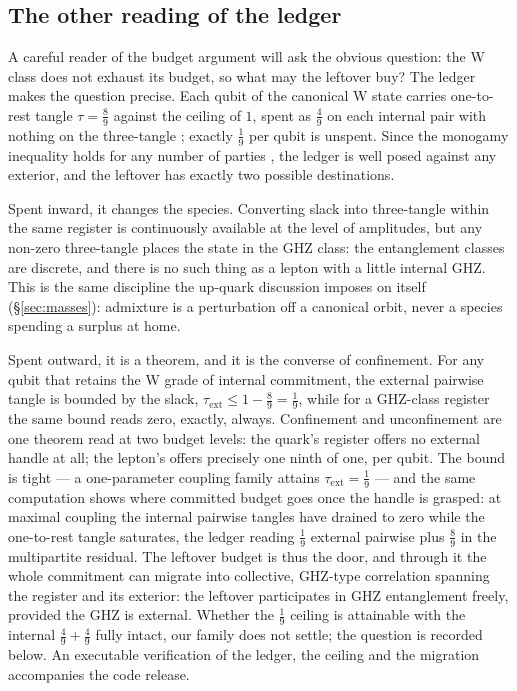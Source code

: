 \subsection{The other reading of the ledger}\label{sec:budget-converse}

A careful reader of the budget argument will ask the obvious question: the W class does not
exhaust its budget, so what may the leftover buy? The ledger makes the question precise. Each
qubit of the canonical W state carries one-to-rest tangle $\tau = \tfrac89$ against the ceiling
of $1$, spent as $\tfrac49$ on each internal pair with nothing on the three-tangle
\autocite{coffmankunduwootters2000}; exactly $\tfrac19$ per qubit is unspent. Since the monogamy
inequality holds for any number of parties \autocite{osborneverstraete2006}, the ledger is well
posed against any exterior, and the leftover has exactly two possible destinations.

Spent inward, it changes the species. Converting slack into three-tangle within the same register
is continuously available at the level of amplitudes, but any non-zero three-tangle places the
state in the GHZ class: the entanglement classes are discrete, and there is no such thing as a
lepton with a little internal GHZ. This is the same discipline the up-quark discussion imposes on
itself (\S\ref{sec:masses}): admixture is a perturbation off a canonical orbit, never a species
spending a surplus at home.

Spent outward, it is a theorem, and it is the converse of confinement. For any qubit that retains
the W grade of internal commitment, the external pairwise tangle is bounded by the slack,
$\tau_{\mathrm{ext}} \le 1 - \tfrac89 = \tfrac19$, while for a GHZ-class register the same
bound reads zero, exactly, always. Confinement and unconfinement are one theorem read at two
budget levels: the quark's register offers no external handle at all; the lepton's offers
precisely one ninth of one, per qubit. The bound is tight --- a one-parameter coupling family
attains $\tau_{\mathrm{ext}} = \tfrac19$ --- and the same computation shows where committed
budget goes once the handle is grasped: at maximal coupling the internal pairwise tangles have
drained to zero while the one-to-rest tangle saturates, the ledger reading $\tfrac19$ external
pairwise plus $\tfrac89$ in the multipartite residual. The leftover budget is thus the door, and
through it the whole commitment can migrate into collective, GHZ-type correlation spanning the
register and its exterior: the leftover participates in GHZ entanglement freely, provided the GHZ
is external. Whether the $\tfrac19$ ceiling is attainable with the internal
$\tfrac49 + \tfrac49$ fully intact, our family does not settle; the question is recorded below.
An executable verification of the ledger, the ceiling and the migration accompanies the code
release.

